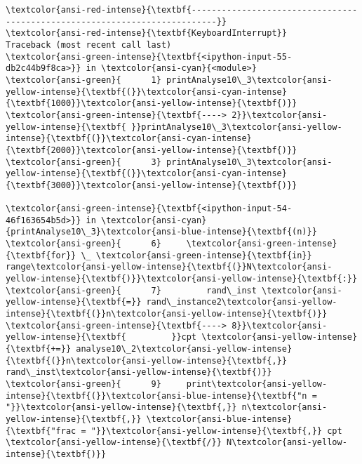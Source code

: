 \documentclass[11pt]{article}
\begin{document}
    \begin{Verbatim}[commandchars=\\\{\}, frame=single, framerule=2mm, rulecolor=\color{outerrorbackground}]
\textcolor{ansi-red-intense}{\textbf{---------------------------------------------------------------------------}}
\textcolor{ansi-red-intense}{\textbf{KeyboardInterrupt}}                         Traceback (most recent call last)
\textcolor{ansi-green-intense}{\textbf{<ipython-input-55-db2c44b9f8ca>}} in \textcolor{ansi-cyan}{<module>}
\textcolor{ansi-green}{      1} printAnalyse10\_3\textcolor{ansi-yellow-intense}{\textbf{(}}\textcolor{ansi-cyan-intense}{\textbf{1000}}\textcolor{ansi-yellow-intense}{\textbf{)}}
\textcolor{ansi-green-intense}{\textbf{----> 2}}\textcolor{ansi-yellow-intense}{\textbf{ }}printAnalyse10\_3\textcolor{ansi-yellow-intense}{\textbf{(}}\textcolor{ansi-cyan-intense}{\textbf{2000}}\textcolor{ansi-yellow-intense}{\textbf{)}}
\textcolor{ansi-green}{      3} printAnalyse10\_3\textcolor{ansi-yellow-intense}{\textbf{(}}\textcolor{ansi-cyan-intense}{\textbf{3000}}\textcolor{ansi-yellow-intense}{\textbf{)}}

\textcolor{ansi-green-intense}{\textbf{<ipython-input-54-46f163654b5d>}} in \textcolor{ansi-cyan}{printAnalyse10\_3}\textcolor{ansi-blue-intense}{\textbf{(n)}}
\textcolor{ansi-green}{      6}     \textcolor{ansi-green-intense}{\textbf{for}} \_ \textcolor{ansi-green-intense}{\textbf{in}} range\textcolor{ansi-yellow-intense}{\textbf{(}}N\textcolor{ansi-yellow-intense}{\textbf{)}}\textcolor{ansi-yellow-intense}{\textbf{:}}
\textcolor{ansi-green}{      7}         rand\_inst \textcolor{ansi-yellow-intense}{\textbf{=}} rand\_instance2\textcolor{ansi-yellow-intense}{\textbf{(}}n\textcolor{ansi-yellow-intense}{\textbf{)}}
\textcolor{ansi-green-intense}{\textbf{----> 8}}\textcolor{ansi-yellow-intense}{\textbf{         }}cpt \textcolor{ansi-yellow-intense}{\textbf{+=}} analyse10\_2\textcolor{ansi-yellow-intense}{\textbf{(}}n\textcolor{ansi-yellow-intense}{\textbf{,}} rand\_inst\textcolor{ansi-yellow-intense}{\textbf{)}}
\textcolor{ansi-green}{      9}     print\textcolor{ansi-yellow-intense}{\textbf{(}}\textcolor{ansi-blue-intense}{\textbf{"n = "}}\textcolor{ansi-yellow-intense}{\textbf{,}} n\textcolor{ansi-yellow-intense}{\textbf{,}} \textcolor{ansi-blue-intense}{\textbf{"frac = "}}\textcolor{ansi-yellow-intense}{\textbf{,}} cpt \textcolor{ansi-yellow-intense}{\textbf{/}} N\textcolor{ansi-yellow-intense}{\textbf{)}}


\end{Verbatim}
\end{document}
